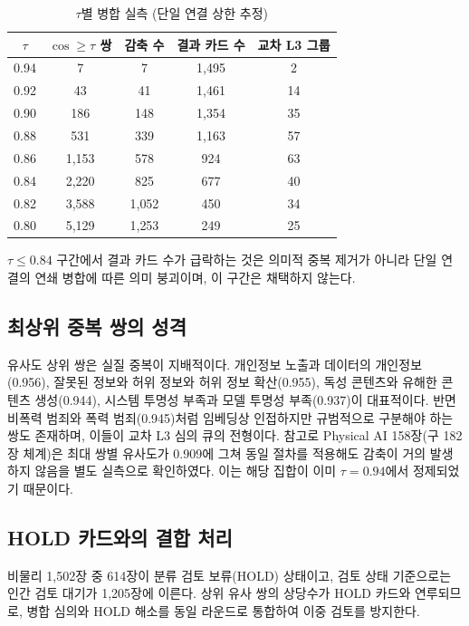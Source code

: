 \documentclass[11pt,a4paper]{article}
\begin{document}
\begin{table}[htbp]
\centering
\caption{$\tau$별 병합 실측 (단일 연결 상한 추정)}
\label{tab:sweep}
\begin{tabular}{ccccc}
\toprule
$\tau$ & $\cos\geq\tau$ 쌍 & 감축 수 & 결과 카드 수 & 교차 L3 그룹 \\
\midrule
0.94 & 7 & 7 & 1{,}495 & 2 \\
0.92 & 43 & 41 & 1{,}461 & 14 \\
0.90 & 186 & 148 & 1{,}354 & 35 \\
0.88 & 531 & 339 & 1{,}163 & 57 \\
0.86 & 1{,}153 & 578 & 924 & 63 \\
0.84 & 2{,}220 & 825 & 677 & 40 \\
0.82 & 3{,}588 & 1{,}052 & 450 & 34 \\
0.80 & 5{,}129 & 1{,}253 & 249 & 25 \\
\bottomrule
\end{tabular}
\end{table}

$\tau \leq 0.84$ 구간에서 결과 카드 수가 급락하는 것은 의미적 중복 제거가 아니라 단일 연결의 연쇄 병합에 따른 의미 붕괴이며, 이 구간은 채택하지 않는다.

\subsection{최상위 중복 쌍의 성격}

유사도 상위 쌍은 실질 중복이 지배적이다. 개인정보 노출과 데이터의 개인정보(0.956), 잘못된 정보와 허위 정보와 허위 정보 확산(0.955), 독성 콘텐츠와 유해한 콘텐츠 생성(0.944), 시스템 투명성 부족과 모델 투명성 부족(0.937)이 대표적이다. 반면 비폭력 범죄와 폭력 범죄(0.945)처럼 임베딩상 인접하지만 규범적으로 구분해야 하는 쌍도 존재하며, 이들이 교차 L3 심의 큐의 전형이다. 참고로 Physical AI 158장(구 182장 체계)은 최대 쌍별 유사도가 0.909에 그쳐 동일 절차를 적용해도 감축이 거의 발생하지 않음을 별도 실측으로 확인하였다. 이는 해당 집합이 이미 $\tau=0.94$에서 정제되었기 때문이다.

\subsection{HOLD 카드와의 결합 처리}

비물리 1{,}502장 중 614장이 분류 검토 보류(HOLD) 상태이고, 검토 상태 기준으로는 인간 검토 대기가 1{,}205장에 이른다. 상위 유사 쌍의 상당수가 HOLD 카드와 연루되므로, 병합 심의와 HOLD 해소를 동일 라운드로 통합하여 이중 검토를 방지한다.
\end{document}
